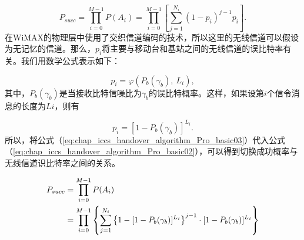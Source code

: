 \begin{equation}
\label{eq:chap_iccs_handover_algorithm_Pro_basic02}
P_{succ}=\prod_{i=0}^{M-1}P(A_{i})=\prod_{i=0}^{M-1}
\left[\sum_{j=1}^{N_{i}}(1-p_{i})^{j-1}p_{i}\right].
\end{equation}
在WiMAX的物理层中使用了交织信道编码的技术，所以这里的无线信道可以假设为无记忆的信道。那么，$p_i$将主要与移动台和基站之间的无线信道的误比特率有关。我们用数学公式表示如下：

$$
p_{i}=\varphi(P_{b}(\gamma_{b}),\: L_{i}),
$$
其中，$P_b(\gamma_b)$是当接收比特信噪比为$\gamma_b$的误比特概率。这样，如果设第$i$个信令消息的长度为$Li$，则有

\begin{equation}\label{eq:chap_iccs_handover_algorithm_Pro_basic03}
p_{i}=[1-P_{b}(\gamma_{b})]^{L_{i}}.
\end{equation}
所以，将公式（\ref{eq:chap_iccs_handover_algorithm_Pro_basic03}）代入公式（\ref{eq:chap_iccs_handover_algorithm_Pro_basic02}），可以得到切换成功概率与无线信道识比特率之间的关系。

\begin{align}
\label{eq:chap_iccs_handover_algorithm_Pro_basic_final}
\notag P_{succ}&=\prod_{i=0}^{M-1}P(A_{i})\\
&=\prod_{i=0}^{M-1}\left\{ \sum_{j=1}^{N_{i}}\left\{ 1-[1-P_{b}(\gamma_{b})]^{L_{i}}\right\} ^{j-1} \cdot[1-P_{b}(\gamma_{b})]^{L_{i}}\right\}
\end{align}


